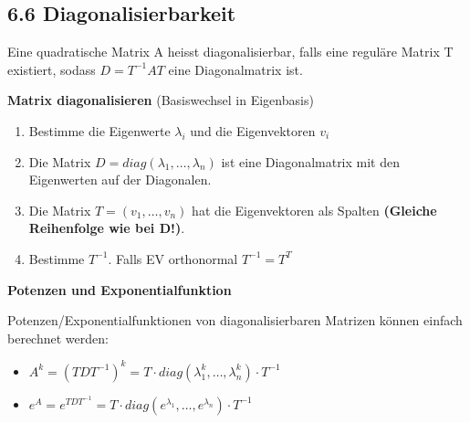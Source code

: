 \subsection{6.6 Diagonalisierbarkeit}{
\vskip1pt
Eine quadratische Matrix A heisst diagonalisierbar, falls eine reguläre Matrix T existiert, sodass $D = T^{-1}AT$ eine Diagonalmatrix ist. 
\par

\begin{center}
\end{center}

\textbf{Matrix diagonalisieren} (Basiswechsel in Eigenbasis)
\begin{enumerate}[label=\protect\circled{\arabic*}]
\item Bestimme die Eigenwerte $\lambda_i$ und die Eigenvektoren $v_i$
\item Die Matrix $D = diag(\lambda_1, \hdots, \lambda_n)$ ist eine Diagonalmatrix mit den Eigenwerten auf der Diagonalen.
\item Die Matrix $T = (v_1, \hdots, v_n)$ hat die Eigenvektoren als Spalten \textbf{(Gleiche Reihenfolge wie bei D!)}.
\item Bestimme $T^{-1}$. Falls EV orthonormal $T^{-1} = T^T$
\end{enumerate}

\vskip3pt

\textbf{Potenzen und Exponentialfunktion} \par \vskip1pt
Potenzen/Exponentialfunktionen von diagonalisierbaren Matrizen können einfach berechnet werden:
\begin{itemize}[leftmargin=0.29cm, itemsep=0.5pt]
\item $A^k = (TDT^{-1})^k = T\cdot diag(\lambda_1^k, \hdots, \lambda_n^k)\cdot T^{-1}$
\item $e^A = e^{TDT^{-1}} = T\cdot diag(e^{\lambda_1}, \hdots, e^{\lambda_n})\cdot T^{-1}$
\end{itemize}


}
\WhiteSpace